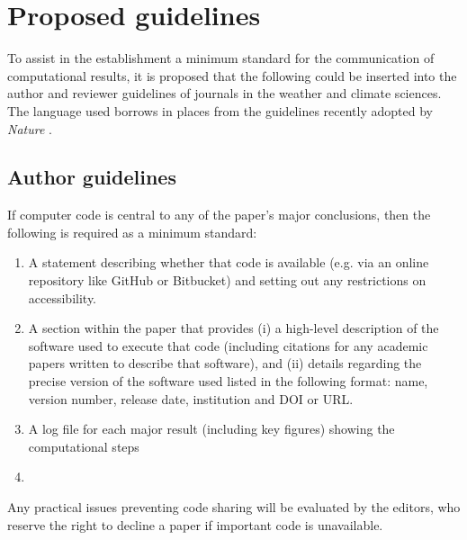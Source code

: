 \section{Proposed guidelines}\label{s:guidelines}

To assist in the establishment a minimum standard for the communication of computational results, it is proposed that the following could be inserted into the author and reviewer guidelines of journals in the weather and climate sciences. The language used borrows in places from the guidelines recently adopted by \textit{Nature} \citep{Nature2014}.

\subsection{Author guidelines}

If computer code is central to any of the paper's major conclusions, then the following is required as a minimum standard: 
\begin{enumerate}
\item A statement describing whether that code is available (e.g. via an online repository like GitHub or Bitbucket) and setting out any restrictions on accessibility.
\item A section within the paper that provides (i) a high-level description of the software used to execute that code (including citations for any academic papers written to describe that software), and (ii) details regarding the precise version of the software used listed in the following format: name, version number, release date, institution and DOI or URL.
\item A log file for each major result (including key figures) showing the computational steps
\item 
\end{enumerate}

Any practical issues preventing code sharing will be evaluated by the editors, who reserve the right to decline a paper if important code is unavailable.